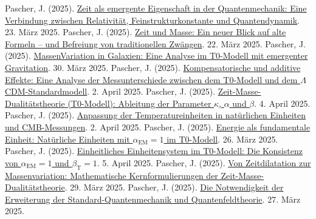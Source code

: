 \documentclass[12pt,a4paper]{article}
\newcommand{\betaT}{\beta_{\text{T}}}
\newcommand{\alphaEM}{\alpha_{\text{EM}}}
\begin{document}
	\begin{thebibliography}{99}
		 Pascher, J. (2025). \href{https://github.com/jpascher/T0-Time-Mass-Duality/tree/main/2/pdf/Deutsch/ZeitEmergentQM.pdf}{Zeit als emergente Eigenschaft in der Quantenmechanik: Eine Verbindung zwischen Relativität, Feinstrukturkonstante und Quantendynamik}. 23. März 2025.
		 Pascher, J. (2025). \href{https://github.com/jpascher/T0-Time-Mass-Duality/tree/main/2/pdf/Deutsch/ZeitMasseNeuerBlick.pdf}{Zeit und Masse: Ein neuer Blick auf alte Formeln – und Befreiung von traditionellen Zwängen}. 22. März 2025.
		 Pascher, J. (2025). \href{https://github.com/jpascher/T0-Time-Mass-Duality/tree/main/2/pdf/Deutsch/MassVarGalaxien.pdf}{MassenVariation in Galaxien: Eine Analyse im T0-Modell mit emergenter Gravitation}. 30. März 2025.
		 Pascher, J. (2025). \href{https://github.com/jpascher/T0-Time-Mass-Duality/tree/main/2/pdf/Deutsch/MessdifferenzenT0Standard.pdf}{Kompensatorische und additive Effekte: Eine Analyse der Messunterschiede zwischen dem T0-Modell und dem \(\Lambda\)CDM-Standardmodell}. 2. April 2025.
		 Pascher, J. (2025). \href{https://github.com/jpascher/T0-Time-Mass-Duality/tree/main/2/pdf/Deutsch/ZeitMasseT0Params.pdf}{Zeit-Masse-Dualitätstheorie (T0-Modell): Ableitung der Parameter \(\kappa\), \(\alpha\) und \(\beta\)}. 4. April 2025.
		 Pascher, J. (2025). \href{https://github.com/jpascher/T0-Time-Mass-Duality/tree/main/2/pdf/Deutsch/TempEinheitenCMB.pdf}{Anpassung der Temperatureinheiten in natürlichen Einheiten und CMB-Messungen}. 2. April 2025.
		 Pascher, J. (2025). \href{https://github.com/jpascher/T0-Time-Mass-Duality/tree/main/2/pdf/Deutsch/NatEinheitenAlpha1.pdf}{Energie als fundamentale Einheit: Natürliche Einheiten mit \(\alphaEM = 1\) im T0-Modell}. 26. März 2025.
		 Pascher, J. (2025). \href{https://github.com/jpascher/T0-Time-Mass-Duality/tree/main/2/pdf/Deutsch/Alpha1Beta1Konsistenz.pdf}{Einheitliches Einheitensystem im T0-Modell: Die Konsistenz von \(\alphaEM = 1\) und \(\betaT = 1\)}. 5. April 2025.
		 Pascher, J. (2025). \href{https://github.com/jpascher/T0-Time-Mass-Duality/tree/main/2/pdf/Deutsch/MathZeitMasseLagrange.pdf}{Von Zeitdilatation zur Massenvariation: Mathematische Kernformulierungen der Zeit-Masse-Dualitätstheorie}. 29. März 2025.
		 Pascher, J. (2025). \href{https://github.com/jpascher/T0-Time-Mass-Duality/tree/main/2/pdf/Deutsch/NotwendigkeitQMErweiterung.pdf}{Die Notwendigkeit der Erweiterung der Standard-Quantenmechanik und Quantenfeldtheorie}. 27. März 2025.

\end{thebibliography}
\end{document}
